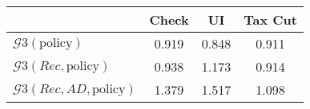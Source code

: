 \begin{tabular}{@{}lccc@{}}
\toprule
                          & Check      & UI    & Tax Cut    \\  \midrule
$\mathcal{G}3(\text{policy})$ & 0.919  & 0.848  & 0.911     \\
$\mathcal{G}3(Rec,\text{policy})$ & 0.938  & 1.173  & 0.914     \\
$\mathcal{G}3(Rec, AD,\text{policy})$ & 1.379  & 1.517  & 1.098     \\
\end{tabular}
